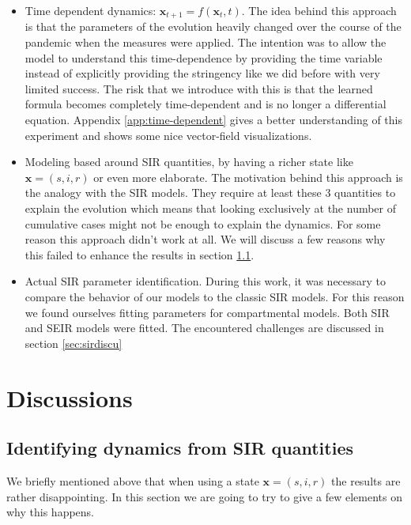 \documentclass[12pt, letterpaper]{article}
\begin{document}
\begin{itemize} 
	\item Time dependent dynamics: $\mathbf{x}_{t+1} = f(\mathbf{x}_t, t)$. 
	The idea behind this approach is that the parameters of the evolution heavily changed over the course of the pandemic when the measures were applied. 
	The intention was to allow the model to understand this time-dependence by providing the time variable instead of explicitly providing the stringency like we did before with very limited success. 
	The risk that we introduce with this is that the learned formula becomes completely time-dependent and is no longer a differential equation.
	Appendix \ref{app:time-dependent} gives a better understanding of this experiment and shows some nice vector-field visualizations.

	\item Modeling based around SIR quantities, by having a richer state like $\mathbf{x} = (s, i, r)$ or even more elaborate. 
	The motivation behind this approach is the analogy with the SIR models.
	They require at least these 3 quantities to explain the evolution which means that looking exclusively at the number of cumulative cases might not be enough to explain the dynamics. For some reason this approach didn't work at all. We will discuss a few reasons why this failed to enhance the results in section \ref{sec:sirfail}.

	\item Actual SIR parameter identification. During this work, it was necessary to compare the behavior of our models to the classic SIR models. For this reason we found ourselves fitting parameters for compartmental models. Both SIR and SEIR models were fitted. The encountered challenges are discussed in section \ref{sec:sirdiscu}

\end{itemize}

\section{Discussions}

\subsection{Identifying dynamics from SIR quantities}\label{sec:sirfail}

We briefly mentioned above that when using a state $\mathbf{x} = (s, i, r)$ the results are rather disappointing. In this section we are going to try to give a few elements on why this happens. 
\end{document}
